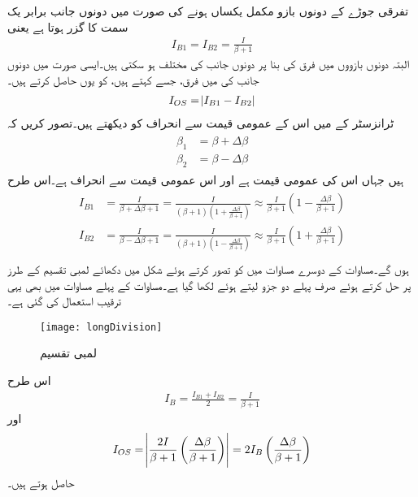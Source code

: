 تفرقی جوڑے کے دونوں بازو مکمل یکساں ہونے کی صورت میں دونوں جانب برابر یک سمت  کا گزر ہوتا ہے یعنی
\begin{align}
I_{B1}=I_{B2}=\frac{I}{\beta+1}
\end{align}
البتہ دونوں بازووں میں فرق کی بنا پر دونوں جانب کی  مختلف ہو سکتی ہیں۔ایسی صورت میں دونوں جانب کی  میں فرق، جسے      کہتے ہیں، کو یوں حاصل کرتے ہیں۔
\begin{align}
I_{OS}=\abs{I_{B1}-I_{B2}}
\end{align}
ٹرانزسٹر کے   میں اس کے عمومی قیمت سے انحراف کو دیکھتے ہیں۔تصور کریں کہ
\begin{gather}
\begin{aligned}
\beta_1 &=\beta+\Delta \beta \\
\beta_2 &=\beta - \Delta \beta
\end{aligned}
\end{gather}
 ہیں جہاں  اس کی عمومی قیمت ہے اور  اس عمومی قیمت سے انحراف ہے۔اس طرح
\begin{gather}
\begin{aligned}\label{مساوات_تفرقی_افزائش_لمبی_تقسیم_الف}
I_{B1}&=\frac{I}{\beta+\Delta \beta +1}=\frac{I}{\left(\beta+1 \right ) \left(1+\frac{\Delta \beta}{\beta+1} \right )} \approx \frac{I}{\beta+1} \left (1-\frac{\Delta \beta}{\beta+1} \right )\\
I_{B2}&=\frac{I}{\beta - \Delta \beta +1}=\frac{I}{\left(\beta+1 \right ) \left(1 - \frac{\Delta \beta}{\beta+1} \right )} \approx \frac{I}{\beta+1} \left (1+ \frac{\Delta \beta}{\beta+1} \right )\\
\end{aligned}
\end{gather}
ہوں گے۔مساوات  کے دوسرے مساوات میں  کو  تصور کرتے ہوئے شکل  میں دکھائے لمبی تقسیم کے طرز  پر حل کرتے ہوئے  صرف پہلے دو جزو لیتے ہوئے  لکھا گیا ہے۔مساوات  کے پہلے مساوات میں بھی یہی ترقیب استعمال کی گئی ہے۔
\begin{figure}
\centering
\texttt{[image: longDivision]}
\caption{لمبی تقسیم}
\label{شکل_لمبی_تقسیم}
\end{figure}
اس طرح
\begin{align}
I_B=\frac{I_{B1}+I_{B2}}{2}=\frac{I}{\beta+1}
\end{align}
اور
\begin{align}
I_{OS}=\abs{\frac{2 I}{\beta+1} \left(\frac{\Delta \beta}{\beta+1} \right )}=2 I_B \left(\frac{\Delta \beta}{\beta+1} \right )
\end{align}
حاصل ہوتے ہیں۔

